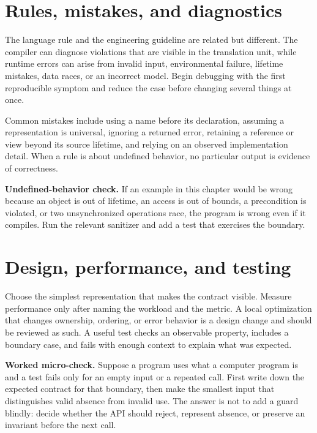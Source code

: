 \section{Rules, mistakes, and diagnostics}
The language rule and the engineering guideline are related but different. The compiler can diagnose violations that are visible in the translation unit, while runtime errors can arise from invalid input, environmental failure, lifetime mistakes, data races, or an incorrect model. Begin debugging with the first reproducible symptom and reduce the case before changing several things at once.

Common mistakes include using a name before its declaration, assuming a representation is universal, ignoring a returned error, retaining a reference or view beyond its source lifetime, and relying on an observed implementation detail. When a rule is about undefined behavior, no particular output is evidence of correctness.

\begin{warning}
\textbf{Undefined-behavior check.} If an example in this chapter would be wrong because an object is out of lifetime, an access is out of bounds, a precondition is violated, or two unsynchronized operations race, the program is wrong even if it compiles. Run the relevant sanitizer and add a test that exercises the boundary.
\end{warning}

\section{Design, performance, and testing}
Choose the simplest representation that makes the contract visible. Measure performance only after naming the workload and the metric. A local optimization that changes ownership, ordering, or error behavior is a design change and should be reviewed as such. A useful test checks an observable property, includes a boundary case, and fails with enough context to explain what was expected.

\begin{worked}
\textbf{Worked micro-check.} Suppose a program uses what a computer program is and a test fails only for an empty input or a repeated call. First write down the expected contract for that boundary, then make the smallest input that distinguishes valid absence from invalid use. The answer is not to add a guard blindly: decide whether the API should reject, represent absence, or preserve an invariant before the next call.
\end{worked}

